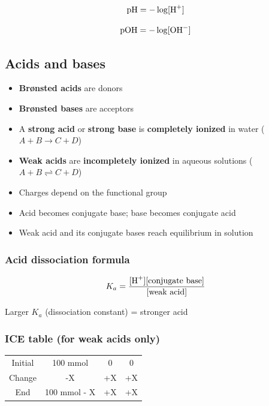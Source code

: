 \documentclass[letterpaper, 12pt]{article}
\begin{document}
\begin{equation} \label{pH}
\mathrm{pH} = -\log [\ce{H+}]
\end{equation}

\begin{equation}
\mathrm{pOH} = -\log [\ce{OH-}]
\end{equation}

\subsection*{Acids and bases}

\begin{itemize}
\item \textbf{Brønsted acids} are  donors
\item \textbf{Brønsted bases} are  acceptors
\item A \textbf{strong acid} or \textbf{strong base} is \textbf{completely ionized} in water ($A + B \to C + D$)
\item \textbf{Weak acids} are \textbf{incompletely ionized} in aqueous solutions ($A + B \rightleftharpoons C + D$)
\item Charges depend on the functional group
\item Acid becomes conjugate base; base becomes conjugate acid
\item Weak acid and its conjugate bases reach equilibrium in solution
\end{itemize}

\subsubsection*{Acid dissociation formula}

 \begin{equation}
K_a = \frac{[\ce{H+}][\text{conjugate base}]}{[\text{weak acid]}}
\end{equation}

Larger $K_a$ (dissociation constant) = stronger acid

\subsubsection*{ICE table (for weak acids only)}

\begin{table}[H]
\centering
\begin{tabular}{cccc}
Initial & 100 mmol & 0 & 0 \\
Change & -X & +X & +X \\
End & 100 mmol - X & +X & +X \\
\end{tabular}
\end{table}
\end{document}
